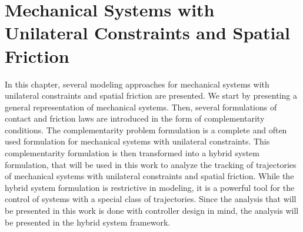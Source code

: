 \documentclass[../DC2017114Bouma.tex]{subfiles}
\begin{document}
\graphicspath{{02_Material/img/}}
\renewcommand{\chaptermark}[1]{\markboth{\thechapter.\ #1}{}}
\renewcommand{\sectionmark}[1]{\markright{#1}{}}
\pagestyle{fancyreport}
\cleartooddpage
\pagestyle{fancyreport}
\chapter{Mechanical Systems with Unilateral Constraints and Spatial Friction}\label{ch:model}
%
%
%
%
%
%
%
%
%
%
%
%
%
%
%
%
%
%
%
%
In this chapter, several modeling approaches for mechanical systems with unilateral constraints and spatial friction are presented. We start by presenting a general representation of mechanical systems. Then, several formulations of contact and friction laws are introduced in the form of complementarity conditions. The complementarity problem formulation is a complete and often used formulation for mechanical systems with unilateral constraints. This complementarity formulation is then transformed into a hybrid system formulation, that will be used in this work to analyze the tracking of trajectories of mechanical systems with unilateral constraints and spatial friction. While the hybrid system formulation is restrictive in modeling, it is a powerful tool for the control of systems with a special class of trajectories. Since the analysis that will be presented in this work is done with controller design in mind, the analysis will be presented in the hybrid system framework.
\end{document}

